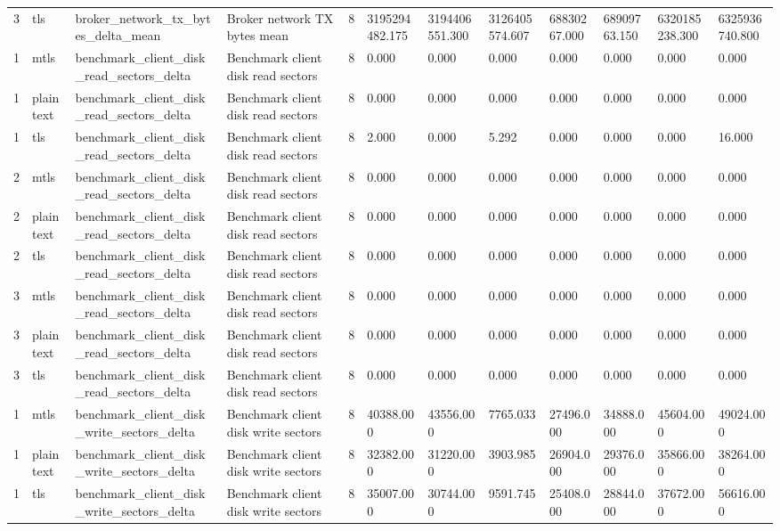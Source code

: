 \begin{longtable}{llllllllllll}
3 & tls & broker\_network\_tx\_bytes\_delta\_mean & Broker network TX bytes mean & 8 & 3195294482.175 & 3194406551.300 & 3126405574.607 & 68830267.000 & 68909763.150 & 6320185238.300 & 6325936740.800 \\
1 & mtls & benchmark\_client\_disk\_read\_sectors\_delta & Benchmark client disk read sectors & 8 & 0.000 & 0.000 & 0.000 & 0.000 & 0.000 & 0.000 & 0.000 \\
1 & plaintext & benchmark\_client\_disk\_read\_sectors\_delta & Benchmark client disk read sectors & 8 & 0.000 & 0.000 & 0.000 & 0.000 & 0.000 & 0.000 & 0.000 \\
1 & tls & benchmark\_client\_disk\_read\_sectors\_delta & Benchmark client disk read sectors & 8 & 2.000 & 0.000 & 5.292 & 0.000 & 0.000 & 0.000 & 16.000 \\
2 & mtls & benchmark\_client\_disk\_read\_sectors\_delta & Benchmark client disk read sectors & 8 & 0.000 & 0.000 & 0.000 & 0.000 & 0.000 & 0.000 & 0.000 \\
2 & plaintext & benchmark\_client\_disk\_read\_sectors\_delta & Benchmark client disk read sectors & 8 & 0.000 & 0.000 & 0.000 & 0.000 & 0.000 & 0.000 & 0.000 \\
2 & tls & benchmark\_client\_disk\_read\_sectors\_delta & Benchmark client disk read sectors & 8 & 0.000 & 0.000 & 0.000 & 0.000 & 0.000 & 0.000 & 0.000 \\
3 & mtls & benchmark\_client\_disk\_read\_sectors\_delta & Benchmark client disk read sectors & 8 & 0.000 & 0.000 & 0.000 & 0.000 & 0.000 & 0.000 & 0.000 \\
3 & plaintext & benchmark\_client\_disk\_read\_sectors\_delta & Benchmark client disk read sectors & 8 & 0.000 & 0.000 & 0.000 & 0.000 & 0.000 & 0.000 & 0.000 \\
3 & tls & benchmark\_client\_disk\_read\_sectors\_delta & Benchmark client disk read sectors & 8 & 0.000 & 0.000 & 0.000 & 0.000 & 0.000 & 0.000 & 0.000 \\
1 & mtls & benchmark\_client\_disk\_write\_sectors\_delta & Benchmark client disk write sectors & 8 & 40388.000 & 43556.000 & 7765.033 & 27496.000 & 34888.000 & 45604.000 & 49024.000 \\
1 & plaintext & benchmark\_client\_disk\_write\_sectors\_delta & Benchmark client disk write sectors & 8 & 32382.000 & 31220.000 & 3903.985 & 26904.000 & 29376.000 & 35866.000 & 38264.000 \\
1 & tls & benchmark\_client\_disk\_write\_sectors\_delta & Benchmark client disk write sectors & 8 & 35007.000 & 30744.000 & 9591.745 & 25408.000 & 28844.000 & 37672.000 & 56616.000 \\

\end{longtable}
